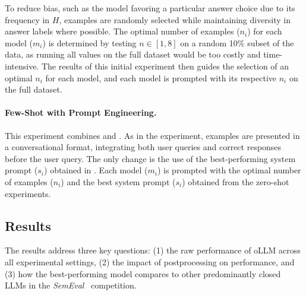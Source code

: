 To reduce bias, such as the model favoring a particular answer choice due to its frequency in $H$, examples are randomly selected while maintaining diversity in answer labels where possible. The optimal number of examples ($n_i$) for each model ($m_i$) is determined by testing $n \in [1, 8]$ on a random 10\% subset of the data, as running all values on the full dataset would be too costly and time-intensive. The results of this initial experiment then guides the selection of an optimal $n_i$ for each model, and each model is prompted with its respective $n_i$ on the full dataset.

\paragraph{Few-Shot with Prompt Engineering.}
\label{sec:few-shot-optimized}

This experiment combines  and . As in the  experiment, examples are presented in a conversational format, integrating both user queries and correct responses before the user query. The only change is the use of the best-performing system prompt ($s_i$) obtained in . Each model ($m_i$) is prompted with the optimal number of examples ($n_i$) and the best system prompt ($s_i$) obtained from the zero-shot experiments.


\subsection{Results}

The results address three key questions: (1) the raw performance of \ac{oLLM} across all experimental settings, (2) the impact of postprocessing on performance, and (3) how the best-performing model compares to other predominantly closed \acp{LLM} in the \textit{SemEval}~\cite{jiangSemEval2024Task92024} competition.


